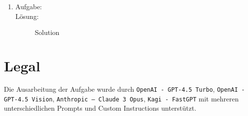 \documentclass[a4paper,11pt]{report}
\begin{document}
\begin{enumerate}
    \item \label{item:backrefA} \hfill %
    \begin{description}
        \item[Aufgabe:]
         \hfill
        \item[Lösung:] \hfill \newline %
            Solution
    \end{description}
\end{enumerate}
\newpage

\chapter{Legal}
Die Ausarbeitung der Aufgabe wurde durch \texttt{OpenAI - GPT-4.5 Turbo}, \texttt{OpenAI - GPT-4.5 Vision}, \texttt{Anthropic -- Claude 3 Opus},  \texttt{Kagi - FastGPT} mit mehreren unterschiedlichen Prompts und Custom Instructions unterstützt.
\end{document}
